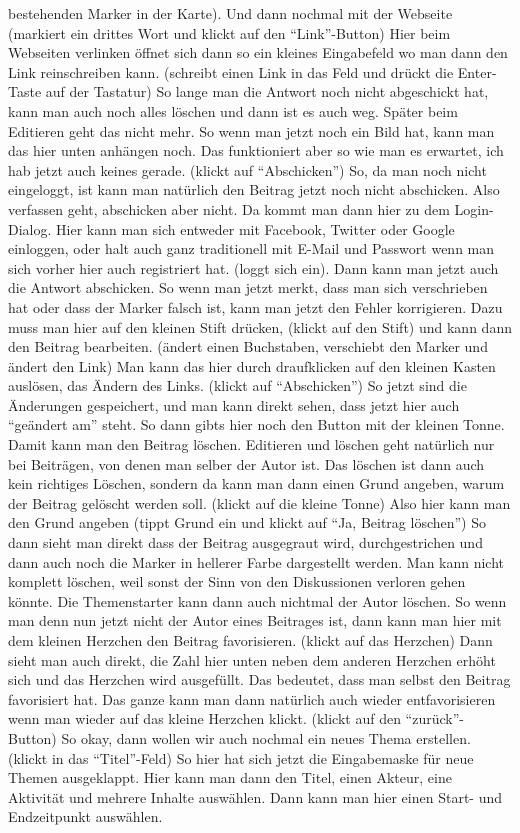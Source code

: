 \begin{itemize}
bestehenden Marker in der Karte). Und dann nochmal mit der Webseite (markiert ein drittes Wort und klickt auf den "`Link"'-Button) Hier beim Webseiten verlinken {\"o}ffnet sich dann so ein kleines Eingabefeld wo man dann den Link reinschreiben kann. (schreibt einen Link in das Feld und dr{\"u}ckt die Enter-Taste auf der Tastatur) So lange man die Antwort noch nicht abgeschickt hat, kann man auch noch alles l{\"o}schen und dann ist es auch weg. Sp{\"a}ter beim Editieren geht das nicht mehr. So wenn man jetzt noch ein Bild hat, kann man das hier unten anh{\"a}ngen noch. Das funktioniert aber so wie man es erwartet, ich hab jetzt auch keines gerade. (klickt auf "`Abschicken"') So, da man noch nicht eingeloggt, ist kann man nat{\"u}rlich den Beitrag jetzt noch nicht abschicken. Also verfassen geht, abschicken aber nicht. Da kommt man dann hier zu dem Login-Dialog. Hier kann man sich entweder mit Facebook, Twitter oder Google einloggen, oder halt auch ganz traditionell mit E-Mail und Passwort wenn man sich vorher hier auch registriert hat. (loggt sich ein). Dann kann man jetzt auch die Antwort abschicken. So wenn man jetzt merkt, dass man sich verschrieben hat oder dass der Marker falsch ist, kann man jetzt den Fehler korrigieren. Dazu muss man hier auf den kleinen Stift dr{\"u}cken, (klickt auf den Stift) und kann dann den Beitrag bearbeiten. ({\"a}ndert einen Buchstaben, verschiebt den Marker und {\"a}ndert den Link) Man kann das hier durch draufklicken auf den kleinen Kasten ausl{\"o}sen, das {\"A}ndern des Links. (klickt auf "`Abschicken"') So jetzt sind die {\"A}nderungen gespeichert, und man kann direkt sehen, dass jetzt hier auch "`ge{\"a}ndert am"' steht. So dann gibts hier noch den Button mit der kleinen Tonne. Damit kann man den Beitrag l{\"o}schen. Editieren und l{\"o}schen geht nat{\"u}rlich nur bei Beitr{\"a}gen, von denen man selber der Autor ist. Das l{\"o}schen ist dann auch kein richtiges L{\"o}schen, sondern da kann man dann einen Grund angeben, warum der Beitrag gel{\"o}scht werden soll. (klickt auf die kleine Tonne) Also hier kann man den Grund angeben (tippt Grund ein und klickt auf "`Ja, Beitrag l{\"o}schen"') So dann sieht man direkt dass der Beitrag ausgegraut wird, durchgestrichen und dann auch noch die Marker in hellerer Farbe dargestellt werden. Man kann nicht komplett l{\"o}schen, weil sonst der Sinn von den Diskussionen verloren gehen k{\"o}nnte. Die Themenstarter kann dann auch nichtmal der Autor l{\"o}schen. So wenn man denn nun jetzt nicht der Autor eines Beitrages ist, dann kann man hier mit dem kleinen Herzchen den Beitrag favorisieren. (klickt auf das Herzchen) Dann sieht man auch direkt, die Zahl hier unten neben dem anderen Herzchen erh{\"o}ht sich und das Herzchen wird ausgef{\"u}llt. Das bedeutet, dass man selbst den Beitrag favorisiert hat. Das ganze kann man dann nat{\"u}rlich auch wieder entfavorisieren wenn man wieder auf das kleine Herzchen klickt. (klickt auf den "`zur{\"u}ck"'-Button) So okay, dann wollen wir auch nochmal ein neues Thema erstellen. (klickt in das "`Titel"'-Feld) So hier hat sich jetzt die Eingabemaske f{\"u}r neue Themen ausgeklappt. Hier kann man dann den Titel, einen Akteur, eine Aktivit{\"a}t und mehrere Inhalte ausw{\"a}hlen. Dann kann man hier einen Start- und Endzeitpunkt ausw{\"a}hlen.  
\end{itemize}
